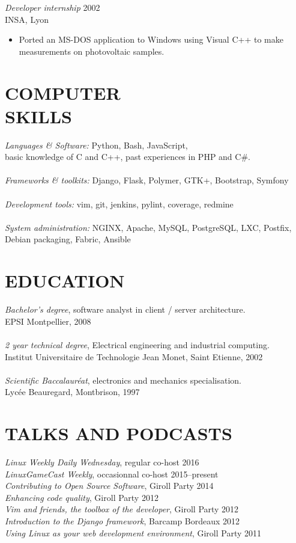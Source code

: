\documentclass[margin]{res}
\begin{document}
\begin{resume}
{\sl Developer internship\/} \hfill 2002 \\
INSA, Lyon
\begin{itemize} \itemsep -2pt
    \item Ported an MS-DOS application to Windows using Visual C++ to make
    measurements on photovoltaic samples.
\end{itemize}

\section{COMPUTER \\ SKILLS}
    {\sl Languages \& Software:\/} Python, Bash, JavaScript, \\
        basic knowledge of C and C++, past experiences in PHP and C\#.\\ \\
    {\sl Frameworks \& toolkits:\/} Django, Flask, Polymer, GTK+, Bootstrap, Symfony\\ \\
    {\sl Development tools:\/} vim, git, jenkins, pylint, coverage, redmine\\ \\
    {\sl System administration:\/} NGINX, Apache, MySQL, PostgreSQL, LXC, Postfix,
        Debian packaging, Fabric, Ansible

\section{EDUCATION}
    {\sl Bachelor's degree}, software analyst in client / server architecture.\\
            EPSI Montpellier, 2008\\ \\
    {\sl 2 year technical degree}, Electrical engineering and  industrial computing.\\
            Institut Universitaire de Technologie Jean Monet, Saint Etienne, 2002\\ \\
    {\sl Scientific Baccalaur\'{e}at}, electronics and mechanics specialisation.\\
            Lyc\'{e}e Beauregard, Montbrison, 1997

\section{TALKS AND PODCASTS}
    {\sl Linux Weekly Daily Wednesday}, regular co-host \hfill 2016 \\
    {\sl LinuxGameCast Weekly}, occasionnal co-host \hfill 2015--present \\
    {\sl Contributing to Open Source Software}, Giroll Party \hfill 2014 \\
    {\sl Enhancing code quality}, Giroll Party \hfill 2012 \\
    {\sl Vim and friends, the toolbox of the developer}, Giroll Party \hfill 2012 \\
    {\sl Introduction to the Django framework}, Barcamp Bordeaux \hfill 2012 \\
    {\sl Using Linux as your web development environment}, Giroll Party \hfill 2011


\end{resume}
\end{document}
